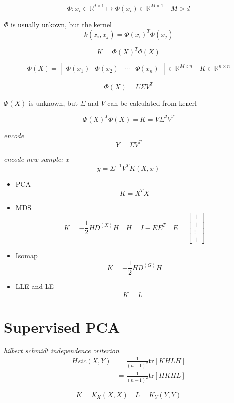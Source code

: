 \documentclass[12pt,a4paper]{article}
\begin{document}
\[
	\Phi: x_i \in \mathbb{R}^{d \times 1} \mapsto \Phi(x_i) \in \mathbb{R}^{M \times 1}\quad M > d
\]

$\Phi$ is usually unkown, but the kernel
\[
 k(x_i,x_j) = \Phi(x_i)^T\Phi(x_j)
\]

\[
	K = \Phi(X)^T\Phi(X)
\]
	
\[ \Phi(X) = \left[ \begin{matrix}
	\Phi(x_1) & \Phi(x_2) & \cdots & \Phi(x_n)
\end{matrix}	  \right] \in \mathbb{R}^{M \times n}
	\quad
	K \in \mathbb{R}^{n \times n}
\]

\[
	\Phi(X) = U \Sigma V^T
\]

$\Phi(X)$ is unknown, but $\Sigma$ and $V$ can be calculated from kenerl

\[
	\Phi(X)^T\Phi(X) = K = V \Sigma^2 V^T
\]

\textit{encode}
\[
	Y = \Sigma V^T
\]

\textit{encode new sample: $x$}
\[
	y = \Sigma^{-1}V^T K(X,x)
\]


\begin{itemize}
\item PCA
\[
	K = X^TX
\]

\item MDS
\[
	K = -\frac{1}{2}HD^{(X)}H \quad H = I-EE^T \quad E = \left[ \begin{matrix}
	1 \\ 1 \\ \vdots \\ 1
	\end{matrix}\right]
\]

\item Isomap
\[
	K = -\frac{1}{2}HD^{(G)}H
\]

\item LLE and LE
\[
	K = L^+
\]

\end{itemize}

\section{Supervised PCA}

\textit{hilbert schmidt independence criterion}
\begin{align*}
	Hsic(X,Y) & = \frac{1}{(n-1)^2}\mathrm{tr}[KHLH] \\
		& = \frac{1}{(n-1)^2}\mathrm{tr}[HKHL]
\end{align*}

\[
	K = K_X(X,X) \quad L = K_Y(Y,Y)
\]
\end{document}
